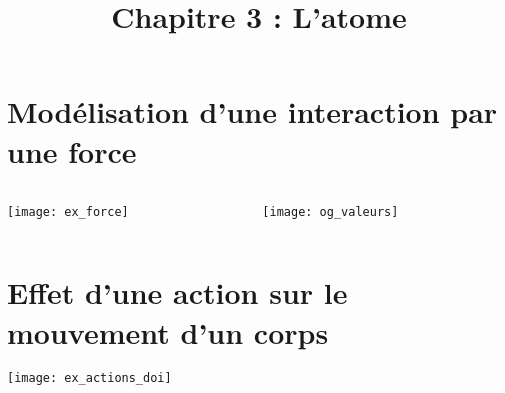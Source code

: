 \documentclass[xcolor={dvipsnames}]{beamer}
\title{Chapitre 3 : L'atome}
\begin{document}
\begin{frame}
  \titlepage 
\end{frame}

\section{Modélisation d'une interaction par une force}


\begin{frame}

\end{frame}

\begin{frame}
%
%
	\begin{columns}
		\begin{column}{0.6\textwidth}
			\begin{center}
				\texttt{[image: ex\_force]}
			\end{center}
		\end{column}
		\begin{column}{0.4\textwidth}
			\begin{center}
				\texttt{[image: og\_valeurs]}
			\end{center}
		\end{column}
	\end{columns}
%
\end{frame}

\section{Effet d'une action sur le mouvement d'un corps}



\begin{frame}

\end{frame}


\begin{frame}
	\begin{center}
		\texttt{[image: ex\_actions\_doi]}
	\end{center}

\end{frame}
\end{document}
